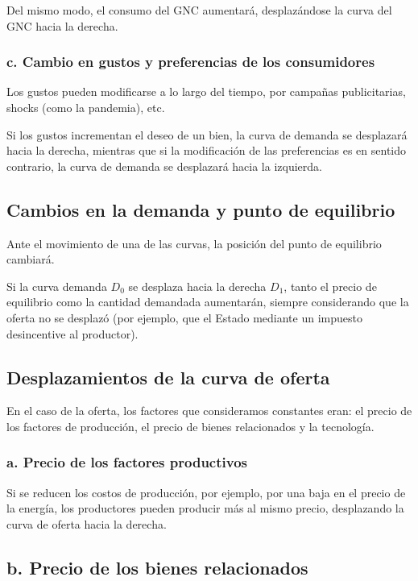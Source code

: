 Del mismo modo, 
el consumo del GNC aumentará,
desplazándose la curva del GNC hacia la derecha.

\subsubsection{c. Cambio en gustos y preferencias de los consumidores} 

Los gustos pueden modificarse a lo largo del tiempo,
por campañas publicitarias,
shocks (como la pandemia),
etc.

Si los gustos incrementan el deseo de un bien,
la curva de demanda se desplazará hacia la derecha,
mientras que si la modificación de las preferencias es en sentido contrario,
la curva de demanda se desplazará hacia la izquierda.

\subsection{Cambios en la demanda y punto de equilibrio}

Ante el movimiento de una de las curvas,
la posición del punto de equilibrio cambiará.

Si la curva demanda \(D_0\) se desplaza hacia la derecha \(D_1\),
tanto el precio de equilibrio como la cantidad demandada aumentarán,
siempre considerando que la oferta no se desplazó
(por ejemplo, 
que el Estado mediante un impuesto desincentive al productor).

\subsection{Desplazamientos de la curva de oferta}

En el caso de la oferta,
los factores que consideramos constantes eran:
el precio de los factores de producción,
el precio de bienes relacionados y la tecnología.

\subsubsection{a. Precio de los factores productivos}

Si se reducen los costos de producción,
por ejemplo,
por una baja en el precio de la energía,
los productores pueden producir más al mismo precio,
desplazando la curva de oferta hacia la derecha.

\subsection{b. Precio de los bienes relacionados}

